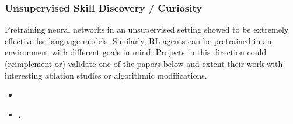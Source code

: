 \documentclass[a4paper]{article}
\begin{document}
%



\subsubsection{Unsupervised Skill Discovery / Curiosity}
Pretraining neural networks in an unsupervised setting showed to be extremely effective for language models. Similarly, RL agents can be pretrained in an environment with different goals in mind. Projects in this direction could (reimplement or) validate one of the papers below and extent their work with interesting ablation studies or algorithmic modifications.
\begin{itemize}
  \item \citet{Laskin2021}
  \item \citet{Hafner2021}, \cite{Hafner2023}
\end{itemize}


\end{document}
